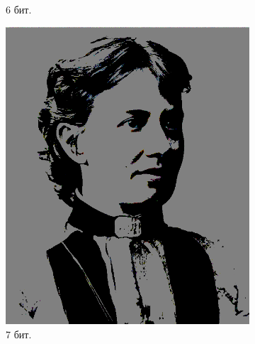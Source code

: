 \documentclass[11pt,a4paper,final]{article} %
\begin{document}
\begin{figure}[h!]
\begin{subfigure}[b]{0.3\linewidth}
		\caption{6 бит.}
		\label{fig:p6}
	\end{subfigure}
	
	\vspace{0.5cm}
	
	\begin{subfigure}[b]{0.3\linewidth}
		\centering
		\includegraphics[width=\linewidth]{img/sofya-7-5.png}
		\caption{7 бит.}
		\label{fig:p7}
	\end{subfigure}
	\hspace{0.05\linewidth} %
	\begin{subfigure}[b]{0.3\linewidth}
		\centering

\end{subfigure}
\end{figure}
\end{document}
